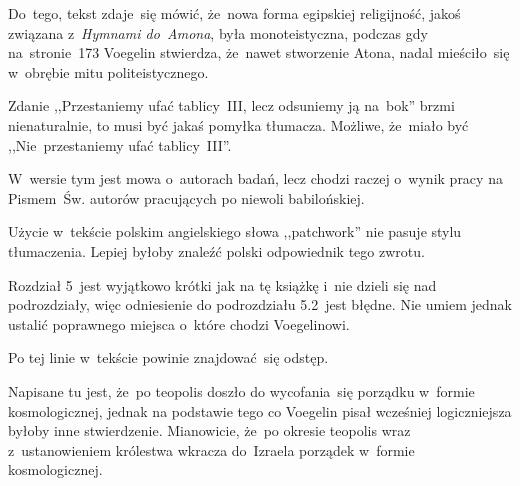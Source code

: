 \documentclass[a4paper,11pt]{article}
\begin{document}
Do~tego, tekst zdaje~się mówić, że~nowa forma egipskiej religijność,
jakoś związana z~\emph{Hymnami do~Amona}, była monoteistyczna, podczas
gdy na~stronie~173 Voegelin stwierdza, że~nawet stworzenie Atona,
nadal mieściło~się w~obrębie mitu politeistycznego.

\vspace{\spaceFour}


\start {} Zdanie ,,Przestaniemy ufać tablicy~III, lecz
odsuniemy ją na~bok'' brzmi nienaturalnie, to musi być jakaś pomyłka
tłumacza. Możliwe, że~miało być ,,Nie~przestaniemy ufać tablicy~III''.

\vspace{\spaceFour}


\start {} W~wersie tym jest mowa o~autorach badań, lecz
chodzi raczej o~wynik pracy na Pismem~Św. autorów pracujących po
niewoli babilońskiej.

\vspace{\spaceFour}


\start {} Użycie w~tekście polskim angielskiego słowa
,,patchwork'' nie pasuje stylu tłumaczenia. Lepiej byłoby znaleźć
polski odpowiednik tego zwrotu.

\vspace{\spaceFour}


\start {} Rozdział 5~jest wyjątkowo krótki jak na tę
książkę i~nie dzieli się nad podrozdziały, więc odniesienie do
podrozdziału 5.2~jest błędne. Nie umiem jednak ustalić poprawnego
miejsca o~które chodzi Voegelinowi.

\vspace{\spaceFour}


\start {} Po tej linie w~tekście powinie znajdować~się
odstęp.

\vspace{\spaceFour}


\start {} Napisane tu jest, że~po teopolis doszło do
wycofania~się porządku w~formie kosmologicznej, jednak na podstawie
tego co Voegelin pisał wcześniej logiczniejsza byłoby inne
stwierdzenie. Mianowicie, że~po okresie teopolis wraz z~ustanowieniem
królestwa wkracza do~Izraela porządek w~formie kosmologicznej.
\end{document}
